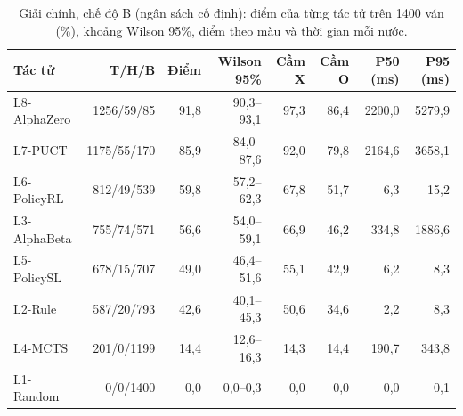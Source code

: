 \begin{table}[H]
  \centering\footnotesize
  \caption{Giải chính, chế độ B (ngân sách cố định): điểm của từng tác tử trên 1400 ván (\%), khoảng Wilson 95\%, điểm theo màu và thời gian mỗi nước.}
  \label{tab:giai-b}
  \setlength{\tabcolsep}{4pt}
  \begin{tabular}{@{}lrrrrrrr@{}}
    \toprule
    Tác tử & T/H/B & Điểm & Wilson 95\% & Cầm X & Cầm O & P50 (ms) & P95 (ms) \\
    \midrule
    L8-AlphaZero & 1256/59/85 & 91{,}8 & 90{,}3--93{,}1 & 97{,}3 & 86{,}4 & 2200{,}0 & 5279{,}9 \\
    L7-PUCT & 1175/55/170 & 85{,}9 & 84{,}0--87{,}6 & 92{,}0 & 79{,}8 & 2164{,}6 & 3658{,}1 \\
    L6-PolicyRL & 812/49/539 & 59{,}8 & 57{,}2--62{,}3 & 67{,}8 & 51{,}7 & 6{,}3 & 15{,}2 \\
    L3-AlphaBeta & 755/74/571 & 56{,}6 & 54{,}0--59{,}1 & 66{,}9 & 46{,}2 & 334{,}8 & 1886{,}6 \\
    L5-PolicySL & 678/15/707 & 49{,}0 & 46{,}4--51{,}6 & 55{,}1 & 42{,}9 & 6{,}2 & 8{,}3 \\
    L2-Rule & 587/20/793 & 42{,}6 & 40{,}1--45{,}3 & 50{,}6 & 34{,}6 & 2{,}2 & 8{,}3 \\
    L4-MCTS & 201/0/1199 & 14{,}4 & 12{,}6--16{,}3 & 14{,}3 & 14{,}4 & 190{,}7 & 343{,}8 \\
    L1-Random & 0/0/1400 & 0{,}0 & 0{,}0--0{,}3 & 0{,}0 & 0{,}0 & 0{,}0 & 0{,}1 \\
    \bottomrule
  \end{tabular}
\end{table}
